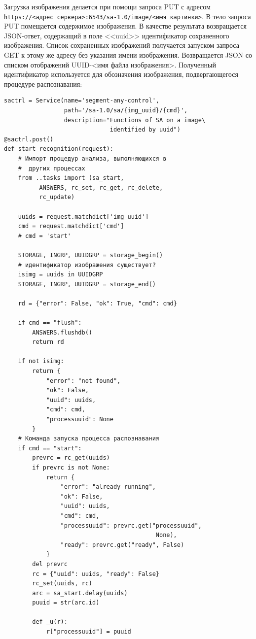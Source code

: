 \documentclass[732,14pt,final]{studrep}
\begin{document}
Загрузка изображения делается при помощи запроса PUT с адресом \verb|https://<адрес сервера>:6543/sa-1.0/image/<имя картинки>|. В тело запроса PUT помещается содержимое изображения. В качестве результата возвращается JSON-ответ, содержащий в поле <<uuid>> идентификатор сохраненного изображения. Список сохраненных изображений получается запуском запроса GET к этому же адресу без указания имени изображения. Возвращается JSON со списком отображений UUID-<имя файла изображения>. Полученный идентификатор используется для обозначения изображения, подвергающегося процедуре распознавания:

\begin{verbatim}
sactrl = Service(name='segment-any-control',
                 path='/sa-1.0/sa/{img_uuid}/{cmd}',
                 description="Functions of SA on a image\
                              identified by uuid")
@sactrl.post()
def start_recognition(request):
    # Импорт процедур анализа, выполняющихся в
    #  других процессах
    from ..tasks import (sa_start,
          ANSWERS, rc_set, rc_get, rc_delete,
          rc_update)

    uuids = request.matchdict['img_uuid']
    cmd = request.matchdict['cmd']
    # cmd = 'start'

    STORAGE, INGRP, UUIDGRP = storage_begin()
    # идентификатор изображения существует?
    isimg = uuids in UUIDGRP
    STORAGE, INGRP, UUIDGRP = storage_end()

    rd = {"error": False, "ok": True, "cmd": cmd}

    if cmd == "flush":
        ANSWERS.flushdb()
        return rd

    if not isimg:
        return {
            "error": "not found",
            "ok": False,
            "uuid": uuids,
            "cmd": cmd,
            "processuuid": None
        }
    # Команда запуска процесса распознавания
    if cmd == "start":
        prevrc = rc_get(uuids)
        if prevrc is not None:
            return {
                "error": "already running",
                "ok": False,
                "uuid": uuids,
                "cmd": cmd,
                "processuuid": prevrc.get("processuuid",
                                           None),
                "ready": prevrc.get("ready", False)
            }
        del prevrc
        rc = {"uuid": uuids, "ready": False}
        rc_set(uuids, rc)
        arc = sa_start.delay(uuids)
        puuid = str(arc.id)

        def _u(r):
            r["processuuid"] = puuid


\end{verbatim}
\end{document}
